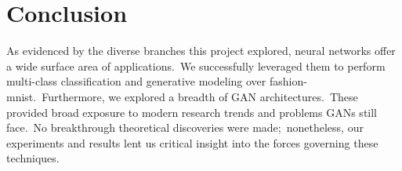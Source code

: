 \documentclass[conference]{IEEEtran}
\begin{document}
    \section{Conclusion}\label{sec:conclusion}

    As evidenced by the diverse branches this project explored, neural networks offer a wide surface area of applications.\ We successfully leveraged them to perform multi-class classification and generative modeling over fashion-mnist.\ Furthermore, we explored a breadth of GAN architectures.\ These provided broad exposure to modern research trends and problems GANs still face.\ No breakthrough theoretical discoveries were made;\ nonetheless, our experiments and results lent us critical insight into the forces governing these techniques.

    
    
\end{document}

